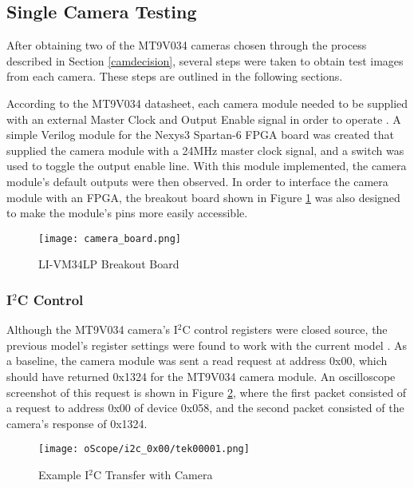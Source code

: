 \subsection{Single Camera Testing}
After obtaining two of the MT9V034 cameras chosen through the process described in Section \ref{camdecision}, several steps were taken to obtain test images from each camera. These steps are outlined in the following sections.
\par
According to the MT9V034 datasheet, each camera module needed to be supplied with an external Master Clock and Output Enable signal in order to operate \cite{mt9v034}. A simple Verilog module for the Nexys3 Spartan-6 FPGA board was created that supplied the camera module with a 24MHz master clock signal, and a switch was used to toggle the output enable line. With this module implemented, the camera module's default outputs were then observed. In order to interface the camera module with an FPGA, the breakout board shown in Figure \ref{camBreakoutBoard} was also designed to make the module's pins more easily accessible. 

\begin{figure}[H]
	\centerline{\texttt{[image: camera\_board.png]}}
	\caption{LI-VM34LP Breakout Board}
	\label{camBreakoutBoard}
\end{figure}

\subsubsection{I$^2$C Control} 
Although the MT9V034 camera's I$^2$C control registers were closed source, the previous model's register settings were found to work with the current model  \cite{mt9v032}. As a baseline, the camera module was sent a read request at address 0x00, which should have returned 0x1324 for the MT9V034 camera module. An oscilloscope screenshot of this request is shown in Figure \ref{camVersion}, where the first packet consisted of a request to address 0x00 of device 0x058, and the second packet consisted of the camera's response of 0x1324.
\begin{figure}[H]
	\centerline{\texttt{[image: oScope/i2c\_0x00/tek00001.png]}}
	\caption{Example I$^2$C Transfer with Camera}
	\label{camVersion}
\end{figure}

